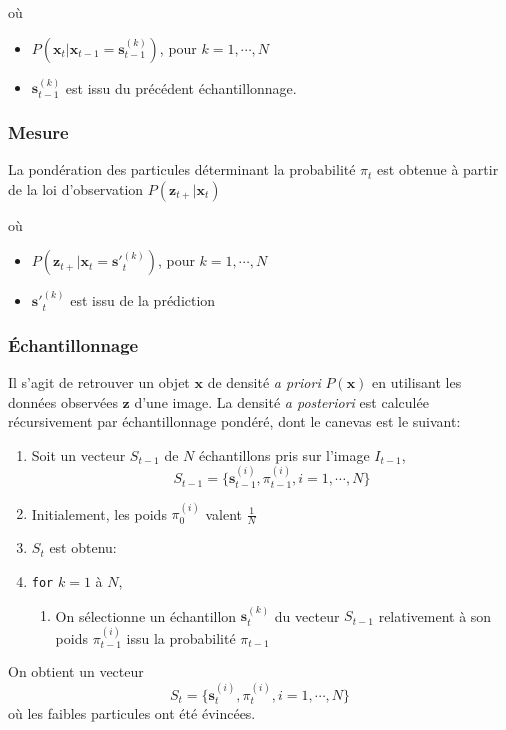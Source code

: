 \documentclass[a4paper,12pt]{report}
\begin{document}
où 
\begin{itemize}
\item[] $P(\mathbf{x}_{t}|\mathbf{x}_{t-1} = \mathbf{s}_{t-1}^{(k)})$, pour $k = 1,\cdots,N$ 
\item[] $\mathbf{s}_{t-1}^{(k)}$ est issu du précédent échantillonnage.
\end{itemize}

\subsubsection{Mesure}

La pondération des particules déterminant la probabilité $\pi_t$ est obtenue à partir de la loi d'observation $P(\mathbf{z}_{t+}|\mathbf{x}_{t})$ 

où
\begin{itemize}
\item[] $P(\mathbf{z}_{t+}|\mathbf{x}_{t} = \mathbf{s'}_{t}^{(k)})$, pour $k = 1,\cdots,N$
\item[] $\mathbf{s'}_{t}^{(k)}$ est issu de la prédiction
\end{itemize}
   

\subsubsection{Échantillonnage}
Il s'agit de retrouver un objet $\mathbf{x}$ de densité \textit{a priori} $P(\mathbf{x})$ en utilisant les données observées $\mathbf{z}$ d'une image.
La densité \textit{a posteriori} est calculée récursivement par échantillonnage pondéré, dont le canevas est le suivant:
\begin{enumerate}
\item Soit un vecteur $S_{t-1}$ de $N$ échantillons pris sur l'image $I_{t-1}$,
$$S_{t-1}=\{ \mathbf{s}_{t-1}^{(i)}, \pi_{t-1}^{(i)}, i=1,\cdots,N\}$$
\item[] Initialement, les poids $\pi_0^{(i)}$ valent $\frac{1}{N}$ 
\item $S_t$ est obtenu:
\item[]\verb+for+ $k=1$ à $N$,
\begin{enumerate}
\item[] On sélectionne un échantillon $\mathbf{s}_t^{(k)}$ du vecteur $S_{t-1}$ relativement à son poids $\pi_{t-1}^{(i)}$ issu la probabilité $\pi_{t-1}$
\end{enumerate}
\end{enumerate} 

On obtient un vecteur $$S_{t}=\{ \mathbf{s}_{t}^{(i)}, \pi_{t}^{(i)}, i=1,\cdots,N\}$$ où les faibles particules ont été évincées.
\end{document}
